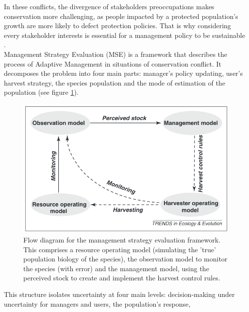 \documentclass[12pt,a4paper]{article}
\begin{document}
In these conflicts, the divergence of stakeholders preoccupations makes conservation more challenging, as people impacted by a protected population's growth are more likely to defect protection policies.
That is why considering every stakeholder interests is essential for a management policy to be sustainable \citep{redpath2013understanding}.\\
%

Management Strategy Evaluation (MSE) is a framework that describes the process of Adaptive Management in situations of conservation conflict.
It decomposes the problem into four main parts: manager's policy updating, user's harvest strategy, the species population and the mode of estimation of the population (see figure \ref{msediagram}).
\begin{figure}
	\centering
	\includegraphics[scale=0.5]{msediagram.png}
	\caption{Flow diagram for the management strategy evaluation framework. This comprises a resource operating model (simulating the 'true' population biology of the species), the observation model to monitor the species (with error) and the management model, using the perceived stock to create and implement the harvest control rules. \citep{BUNNEFELD2011441}}
	\label{msediagram}
\end{figure}
This structure isolates uncertainty at four main levels: decision-making under uncertainty for managers and users, the population's response,
\end{document}

